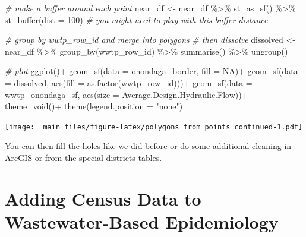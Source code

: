 \documentclass[
]{book}
\newenvironment{Shaded}{\begin{snugshade}}{\end{snugshade}}
\newcommand{\AttributeTok}[1]{\textcolor[rgb]{0.77,0.63,0.00}{#1}}
\newcommand{\CommentTok}[1]{\textcolor[rgb]{0.56,0.35,0.01}{\textit{#1}}}
\newcommand{\ConstantTok}[1]{\textcolor[rgb]{0.00,0.00,0.00}{#1}}
\newcommand{\DecValTok}[1]{\textcolor[rgb]{0.00,0.00,0.81}{#1}}
\newcommand{\FunctionTok}[1]{\textcolor[rgb]{0.00,0.00,0.00}{#1}}
\newcommand{\NormalTok}[1]{#1}
\newcommand{\OtherTok}[1]{\textcolor[rgb]{0.56,0.35,0.01}{#1}}
\newcommand{\SpecialCharTok}[1]{\textcolor[rgb]{0.00,0.00,0.00}{#1}}
\newcommand{\StringTok}[1]{\textcolor[rgb]{0.31,0.60,0.02}{#1}}
\begin{document}
\begin{Shaded}
\begin{Highlighting}[]
\CommentTok{\# make a buffer around each point}
\NormalTok{near\_df }\OtherTok{\textless{}{-}}\NormalTok{ near\_df }\SpecialCharTok{\%\textgreater{}\%}
  \FunctionTok{st\_as\_sf}\NormalTok{() }\SpecialCharTok{\%\textgreater{}\%}
  \FunctionTok{st\_buffer}\NormalTok{(}\AttributeTok{dist =} \DecValTok{100}\NormalTok{) }\CommentTok{\# you might need to play with this buffer distance}

\CommentTok{\# group by wwtp\_row\_id and merge into polygons}
\CommentTok{\# then dissolve}
\NormalTok{dissolved }\OtherTok{\textless{}{-}}\NormalTok{ near\_df }\SpecialCharTok{\%\textgreater{}\%} 
  \FunctionTok{group\_by}\NormalTok{(wwtp\_row\_id) }\SpecialCharTok{\%\textgreater{}\%}
  \FunctionTok{summarise}\NormalTok{() }\SpecialCharTok{\%\textgreater{}\%}
  \FunctionTok{ungroup}\NormalTok{()}

\CommentTok{\# plot}
\FunctionTok{ggplot}\NormalTok{()}\SpecialCharTok{+}
  \FunctionTok{geom\_sf}\NormalTok{(}\AttributeTok{data =}\NormalTok{ onondaga\_border, }\AttributeTok{fill =} \ConstantTok{NA}\NormalTok{)}\SpecialCharTok{+}
  \FunctionTok{geom\_sf}\NormalTok{(}\AttributeTok{data =}\NormalTok{ dissolved, }\FunctionTok{aes}\NormalTok{(}\AttributeTok{fill =} \FunctionTok{as.factor}\NormalTok{(wwtp\_row\_id)))}\SpecialCharTok{+}
  \FunctionTok{geom\_sf}\NormalTok{(}\AttributeTok{data =}\NormalTok{ wwtp\_onondaga\_sf, }\FunctionTok{aes}\NormalTok{(}\AttributeTok{size =} \StringTok{\textasciigrave{}}\AttributeTok{Average.Design.Hydraulic.Flow}\StringTok{\textasciigrave{}}\NormalTok{))}\SpecialCharTok{+}
  \FunctionTok{theme\_void}\NormalTok{()}\SpecialCharTok{+}
  \FunctionTok{theme}\NormalTok{(}\AttributeTok{legend.position =} \StringTok{"none"}\NormalTok{)}
\end{Highlighting}
\end{Shaded}

\texttt{[image: \_main\_files/figure-latex/polygons from points continued-1.pdf]}

You can then fill the holes like we did before or do some additional cleaning in ArcGIS or from the special districts tables.

\hypertarget{adding-census-data-to-wastewater-based-epidemiology}{%
\chapter{Adding Census Data to Wastewater-Based Epidemiology}\label{adding-census-data-to-wastewater-based-epidemiology}}
\end{document}
